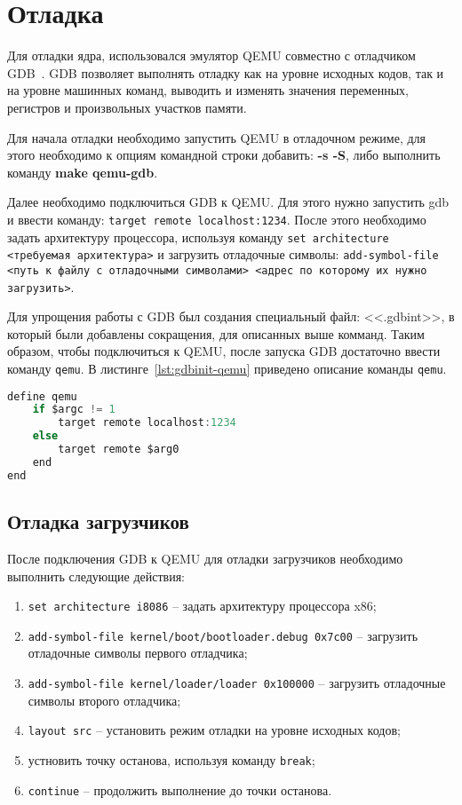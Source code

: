 \section{Отладка}
Для отладки ядра, использовался эмулятор QEMU совместно с отладчиком GDB~\cite{gdb}.
GDB позволяет выполнять отладку как на уровне исходных кодов, так и на уровне машинных команд,
выводить и изменять значения переменных, регистров и произвольных участков памяти.

Для начала отладки необходимо запустить QEMU в отладочном режиме, для этого необходимо
к опциям командной строки добавить: \textbf{-s -S}, либо выполнить команду \textbf{make qemu-gdb}.

Далее необходимо подключиться GDB к QEMU. Для этого нужно запустить gdb и ввести команду:
\texttt{target remote localhost:1234}. После этого необходимо задать архитектуру процессора,
используя команду \texttt{set architecture <требуемая архитектура>} и загрузить отладочные
символы: \texttt{add-symbol-file <путь к файлу с отладочными символами> <адрес по которому их нужно загрузить>}.

Для упрощения работы с GDB был создания специальный файл: <<.gdbint>>, в который были добавлены
сокращения, для описанных выше комманд. Таким образом, чтобы подключиться к QEMU, после запуска
GDB достаточно ввести команду \texttt{qemu}. В листинге~\ref{lst:gdbinit-qemu} приведено описание
команды \texttt{qemu}.

\begin{lstlisting}[language=C, caption={Реализация команды <<qemu>>}, label={lst:gdbinit-qemu}]
define qemu
	if $argc != 1
		target remote localhost:1234
	else
		target remote $arg0
	end
end
\end{lstlisting}

\subsection{Отладка загрузчиков}
После подключения GDB к QEMU для отладки загрузчиков необходимо выполнить следующие действия:
\begin{enumerate}[1.]
	\item \texttt{set architecture i8086} -- задать архитектуру процессора x86;
	\item \texttt{add-symbol-file kernel/boot/bootloader.debug 0x7c00} -- загрузить отладочные
		символы первого отладчика;
	\item \texttt{add-symbol-file kernel/loader/loader 0x100000} -- загрузить отладочные символы
		второго отладчика;
	\item \texttt{layout src} -- установить режим отладки на уровне исходных кодов;
	\item устновить точку останова, используя команду \texttt{break};
	\item \texttt{continue} -- продолжить выполнение до точки останова.
\end{enumerate}

